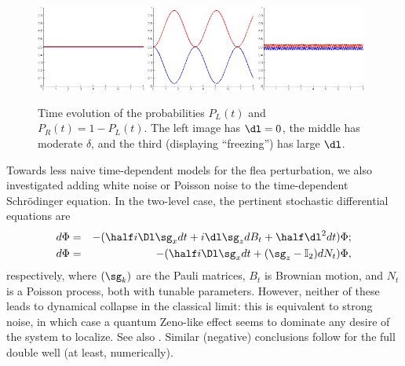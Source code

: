 \documentclass[12pt]{article}
\def\red#1{\textcolor{slidered}{#1}}
\def\blue#1{\textcolor{slideblue}{#1}}
\begin{document}
\begin{figure}[H]
\begin{center}
\includegraphics[width=0.32\textwidth]{GeenStoring.png}
\includegraphics[width=0.32\textwidth]{KleineStoring.png}
\includegraphics[width=0.32\textwidth]{GroteStoring.png}
\caption{Time evolution of the probabilities \blue{$P_L(t)$} and \red{$P_R(t)=1-P_L(t)$}.
The left image has $\dl=0$,  the middle has moderate $\delta$,  and the third  (displaying ``freezing'') has large $\dl$.}
\label{TLSConstant}
\end{center}
\end{figure}
\vspace{-5mm}
Towards less naive time-dependent models for the flea perturbation, we also investigated adding white noise or Poisson noise to the  time-dependent  Schr\"{o}dinger equation. In the two-level case, the pertinent
stochastic differential equations are
\begin{eqnarray}
d\Phi&=& -(\half i\Dl \sg_x dt+i\dl\sg_z dB_t+\half\dl^2 dt)\Phi;\\
d\Phi&=&-(\half i\Dl \sg_x dt+ (\sg_z-\mathbb{I}_2)dN_t)\Phi,
\end{eqnarray}
respectively, where $(\sg_k)$ are the Pauli matrices, $B_t$ is Brownian motion, and $N_t$ is a Poisson process, both with tunable parameters. 
However, neither of these leads to dynamical collapse in the classical limit: this is equivalent to strong noise, in which case  a quantum Zeno-like effect seems to dominate any desire of the system to localize.
See also  \cite{Berry, Blanchard1, MS2}.
Similar (negative) conclusions follow for the full double well (at least, numerically).
\medskip
\end{document}
